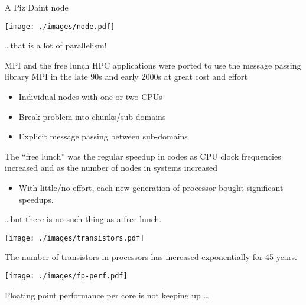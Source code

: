 \documentclass[aspectratio=43]{beamer}
\begin{document}
\begin{frame}[fragile]{A Piz Daint node}
    \begin{center}
        \texttt{[image: ./images/node.pdf]}
    \end{center}
    \dots that is a lot of parallelism!
\end{frame}


\begin{frame}[fragile]{MPI and the free lunch}
    HPC applications were ported to use the message passing library MPI in the late 90s and early 2000s at great cost and effort
    \begin{itemize}
        \item Individual nodes with one or two CPUs
        \item Break problem into chunks/sub-domains
        \item Explicit message passing between sub-domains
    \end{itemize}
    The ``free lunch'' was the regular speedup in codes as CPU clock frequencies increased and as the number of nodes in systems increased
    \begin{itemize}
        \item With little/no effort, each new generation of processor bought significant speedups.
    \end{itemize}

    \dots  but there is no such thing as a free lunch.
\end{frame}

\begin{frame}[fragile]{}
    \begin{center}
        \texttt{[image: ./images/transistors.pdf]}

        The number of transistors in processors has increased exponentially for 45 years.
    \end{center}
\end{frame}

\begin{frame}[fragile]{}
    \begin{center}
        \texttt{[image: ./images/fp-perf.pdf]}

        Floating point performance per core is not keeping up \dots
    \end{center}
\end{frame}
\end{document}
